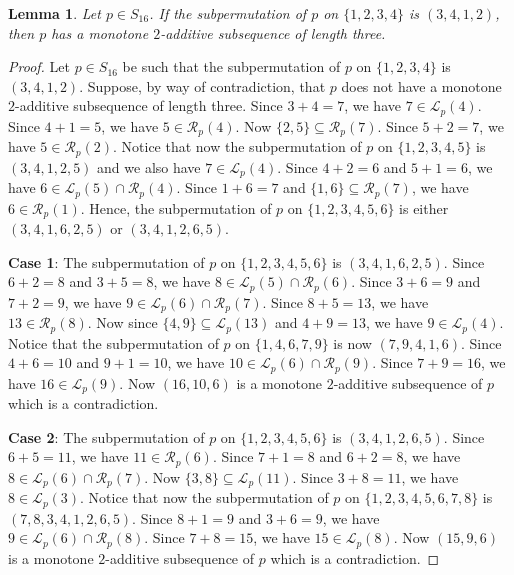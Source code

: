 \documentclass[10pt,a4paper]{amsart}
\newtheorem{lemma}[theorem]{Lemma}
\begin{document}
\begin{lemma}\label{Lemma:Monotone3412}
Let $p\in S_{16}$. If the subpermutation of $p$ on $\{1,2,3,4\}$ is $(3,4,1,2)$, then $p$ has a monotone $2$-additive subsequence of length three.
\end{lemma}
\begin{proof}
    Let $p\in S_{16}$ be such that the subpermutation of $p$ on $\{1,2,3,4\}$ is $(3,4,1,2)$. Suppose, by way of contradiction, that $p$ does not have a monotone $2$-additive subsequence of length three. Since $3+4=7$, we have $7\in\mathcal{L}_p(4)$. Since $4+1=5$, we have $5\in\mathcal{R}_p(4)$. Now $\{2,5\}\subseteq\mathcal{R}_p(7)$. Since $5+2=7$, we have $5\in\mathcal{R}_p(2)$. Notice that now the subpermutation of $p$ on $\{1,2,3,4,5\}$ is $(3,4,1,2,5)$ and we also have $7\in\mathcal{L}_p(4)$. Since $4+2=6$ and $5+1=6$, we have $6\in\mathcal{L}_p(5)\cap\mathcal{R}_p(4)$. Since $1+6=7$ and $\{1,6\}\subseteq\mathcal{R}_p(7)$, we have $6\in\mathcal{R}_p(1)$. Hence, the subpermutation of $p$ on $\{1,2,3,4,5,6\}$ is either $(3,4,1,6,2,5)$ or $(3,4,1,2,6,5)$.

    {\bf Case 1}: The subpermutation of $p$ on $\{1,2,3,4,5,6\}$ is $(3,4,1,6,2,5)$. Since $6+2=8$ and $3+5=8$, we have $8\in\mathcal{L}_p(5)\cap\mathcal{R}_p(6)$. Since $3+6=9$ and $7+2=9$, we have $9\in\mathcal{L}_p(6)\cap\mathcal{R}_p(7)$. Since $8+5=13$, we have $13\in\mathcal{R}_p(8)$. Now since $\{4,9\}\subseteq\mathcal{L}_p(13)$ and $4+9=13$, we have $9\in\mathcal{L}_p(4)$. Notice that the subpermutation of $p$ on $\{1,4,6,7,9\}$ is now $(7,9,4,1,6)$. Since $4+6=10$ and $9+1=10$, we have $10\in\mathcal{L}_p(6)\cap\mathcal{R}_p(9)$. Since $7+9=16$, we have $16\in\mathcal{L}_p(9)$. Now $(16,10,6)$ is a monotone $2$-additive subsequence of $p$ which is a contradiction.

    {\bf Case 2}: The subpermutation of $p$ on $\{1,2,3,4,5,6\}$ is $(3,4,1,2,6,5)$. Since $6+5=11$, we have $11\in\mathcal{R}_p(6)$. Since $7+1=8$ and $6+2=8$, we have $8\in\mathcal{L}_p(6)\cap\mathcal{R}_p(7)$. Now $\{3,8\}\subseteq\mathcal{L}_p(11)$. Since $3+8=11$, we have $8\in\mathcal{L}_p(3)$. Notice that now the subpermutation of $p$ on $\{1,2,3,4,5,6,7,8\}$ is $(7,8,3,4,1,2,6,5)$. Since $8+1=9$ and $3+6=9$, we have $9\in\mathcal{L}_p(6)\cap\mathcal{R}_p(8)$. Since $7+8=15$, we have $15\in\mathcal{L}_p(8)$. Now $(15,9,6)$ is a monotone $2$-additive subsequence of $p$ which is a contradiction.
\end{proof}
\end{document}
